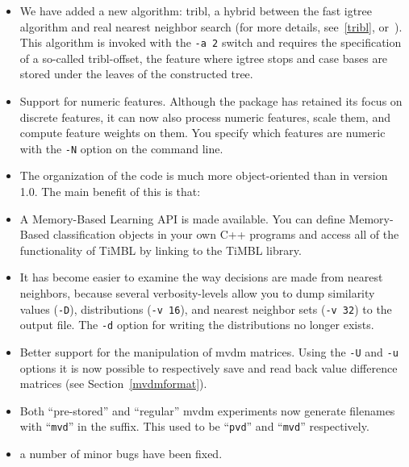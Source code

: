 \documentclass{report}
\begin{document}
\begin{itemize}

\item We have added a new algorithm: {\sc tribl}, a hybrid between
the fast {\sc igtree} algorithm and real nearest neighbor search (for
more details, see~\ref{tribl}, or~\cite{Daelemans+97d}). This
algorithm is invoked with the {\tt -a 2} switch and requires the
specification of a so-called {\sc tribl}-offset, the feature where
{\sc igtree} stops and case bases are stored under the leaves of the
constructed tree.

\item Support for numeric features. Although the package has retained
its focus on discrete features, it can now also process numeric
features, scale them, and compute feature weights on them. You
specify which features are numeric with the {\tt -N} option on the
command line.

\item The organization of the code is much more object-oriented than
in version 1.0. The main benefit of this is that:

\item A Memory-Based Learning API is made available. You can define
Memory-Based classification objects in your own C++ programs and
access all of the functionality of TiMBL by linking to the TiMBL
library.

\item It has become easier to examine the way decisions are made from
nearest neighbors, because several verbosity-levels allow you to dump
similarity values ({\tt -D}), distributions ({\tt -v 16}), and nearest
neighbor sets ({\tt -v 32}) to the output file. The {\tt -d} option
for writing the distributions no longer exists.

\item Better support for the manipulation of {\sc mvdm}
matrices. Using the {\tt -U} and {\tt -u} options it is now possible
to respectively save and read back value difference matrices (see
Section~\ref{mvdmformat}).

\item Both ``pre-stored'' and ``regular'' {\sc mvdm} experiments now
generate filenames with ``{\tt mvd}'' in the suffix. This used to be
``{\tt pvd}'' and ``{\tt mvd}'' respectively.

\item a number of minor bugs have been fixed.

\end{itemize}
\end{document}
